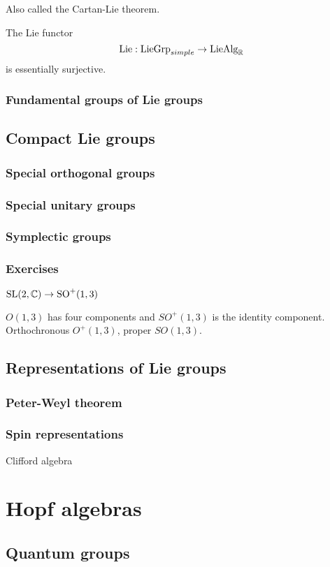 \documentclass{../../large}
\begin{document}
\begin{prb}
Also called the Cartan-Lie theorem.
\begin{parts}
\item The Lie functor
\[\mathrm{Lie}:\mathrm{LieGrp}_{simple}\to\mathrm{LieAlg}_{\mathbb{R}}\]
is essentially surjective.
\end{parts}
\end{prb}

\section{Fundamental groups of Lie groups}



\chapter{Compact Lie groups}
\section{Special orthogonal groups}
\section{Special unitary groups}
\section{Symplectic groups}

\section*{Exercises}
\begin{prb}
$\mathrm{SL}(2,\mathbb{C})\to\mathrm{SO}^+(1,3)$
\begin{parts}
\item $O(1,3)$ has four components and $SO^+(1,3)$ is the identity component. Orthochronous $O^+(1,3)$, proper $SO(1,3)$.
\end{parts}
\end{prb}




\chapter{Representations of Lie groups}
\section{Peter-Weyl theorem}
\section{Spin representations}
Clifford algebra






\part{Hopf algebras}
\chapter{}
\chapter{Quantum groups}
\end{document}

